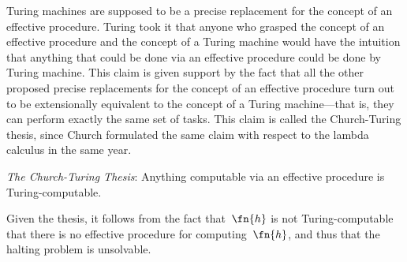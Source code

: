 \documentclass[../../include/open-logic-section]{subfiles}
\begin{document}

Turing machines are supposed to be a precise replacement for the concept
of an effective procedure. Turing took it that anyone who grasped the
concept
of an effective procedure and the concept of a Turing machine would have
the intuition that anything that could be done via an effective procedure
could be done by Turing machine. This claim is given support by the fact
that all the other proposed precise replacements for the concept of an
effective procedure turn out to be extensionally equivalent to the concept
of a Turing machine---that is, they can perform exactly the same set of
tasks. This claim is called the Church-Turing thesis, since Church
formulated the same claim with respect to the lambda calculus in the same
year.

\begin{defn}
\emph{The Church-Turing Thesis}: Anything computable via an effective
procedure is Turing-computable.
\end{defn}

Given the thesis, it follows from the fact that~$\fn{h}$ is not
Turing-computable that there is no effective procedure for
computing~$\fn{h}$, and thus that the halting problem is unsolvable.
\end{document}

